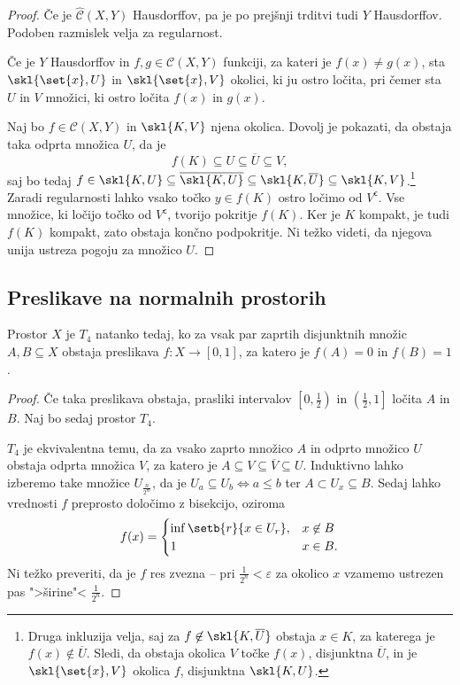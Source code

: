 \begin{proof}
Če je $\widehat{\mathcal{C}}(X,Y)$ Hausdorffov, pa je po prejšnji
trditvi tudi $Y$ Hausdorffov. Podoben razmislek velja za
regularnost.

Če je $Y$ Hausdorffov in $f, g \in \mathcal{C}(X,Y)$ funkciji, za
kateri je $f(x) \ne g(x)$, sta $\skl{\set{x},U}$ in
$\skl{\set{x},V}$ okolici, ki ju ostro ločita, pri čemer sta $U$ in
$V$ množici, ki ostro ločita $f(x)$ in $g(x)$.

Naj bo $f \in \mathcal{C}(X,Y)$ in $\skl{K,V}$ njena okolica.
Dovolj je pokazati, da obstaja taka odprta množica $U$, da je
\[
f(K) \subseteq U \subseteq \overline{U} \subseteq V,
\]
saj bo tedaj
$f \in \skl{K,U} \subseteq \overline{\skl{K,U}} \subseteq
\skl{K,\overline{U}} \subseteq \skl{K,V}$.\footnote{Druga inkluzija
velja, saj za $f \not \in \skl{K, \overline{U}}$ obstaja $x \in K$,
za katerega je $f(x) \not \in \overline{U}$. Sledi, da obstaja
okolica $V$ točke $f(x)$, disjunktna $\overline{U}$, in je
$\skl{\set{x},V}$ okolica $f$, disjunktna $\skl{K,U}$.}
Zaradi regularnosti lahko vsako točko $y \in f(K)$ ostro ločimo od
$V^{\mathsf{c}}$. Vse množice, ki ločijo točko od $V^{\mathsf{c}}$,
tvorijo pokritje $f(K)$. Ker je $K$ kompakt, je tudi $f(K)$
kompakt, zato obstaja končno podpokritje. Ni težko videti, da
njegova unija ustreza pogoju za množico $U$.
\end{proof}

\newpage

\subsection{Preslikave na normalnih prostorih}


\begin{lema}[Urison]
Prostor $X$ je $T_4$ natanko tedaj, ko za vsak par zaprtih
disjunktnih množic $A, B \subseteq X$ obstaja preslikava
$f \colon X \to [0,1]$, za katero je $f(A)=0$ in $f(B)=1$.
\end{lema}

\begin{proof}
Če taka preslikava obstaja, prasliki intervalov
$\left[0,\frac{1}{2}\right)$ in $\left(\frac{1}{2},1\right]$ ločita
$A$ in $B$. Naj bo sedaj prostor $T_4$.

$T_4$ je ekvivalentna temu, da za vsako zaprto množico $A$ in
odprto množico $U$ obstaja odprta množica $V$, za katero je
$A \subseteq V \subseteq \overline{V} \subseteq U$. Induktivno
lahko izberemo take množice $U_{\frac{n}{2^m}}$, da je
$U_a \subseteq U_b \iff a \leq b$ ter $A \subset U_x \subseteq B$.
Sedaj lahko vrednosti $f$ preprosto določimo z bisekcijo, oziroma
\[
f(x) = \begin{cases}
\inf \setb{r}{x \in U_r}, & x \not\in B \\
1                         & x \in B.
\end{cases}
\]
Ni težko preveriti, da je $f$ res zvezna -- pri
$\frac{1}{2^n} < \varepsilon$ za okolico $x$ vzamemo ustrezen pas
">širine"< $\frac{1}{2^n}$.
\end{proof}

